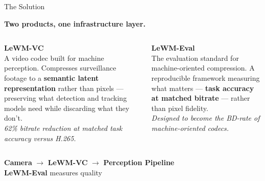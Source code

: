 \documentclass[aspectratio=169, professionalfonts, 10pt]{beamer}
\begin{document}
\begin{frame}{The Solution}

  \textbf{Two products, one infrastructure layer.}

  \bigskip
  \begin{columns}[t]
    \begin{center}
      \textbf{LeWM-VC} \\
      \small
      A video codec built for machine perception. Compresses surveillance footage to a \textbf{semantic latent representation} rather than pixels --- preserving what detection and tracking models need while discarding what they don't. \\[0.3em]
      \textit{62\% bitrate reduction at matched task accuracy versus H.265.}
    \end{center}

    \begin{center}
      \textbf{LeWM-Eval} \\
      \small
      The evaluation standard for machine-oriented compression. A reproducible framework measuring what matters --- \textbf{task accuracy at matched bitrate} --- rather than pixel fidelity. \\[0.3em]
      \textit{Designed to become the BD-rate of machine-oriented codecs.}
    \end{center}
  \end{columns}

  \bigskip
  \begin{center}
    \textbf{Camera} $\rightarrow$ \textbf{LeWM-VC} $\rightarrow$ \textbf{Perception Pipeline} \\
    \vspace{0.3em}
    \textbf{LeWM-Eval} measures quality
  \end{center}
\end{frame}
\end{document}
